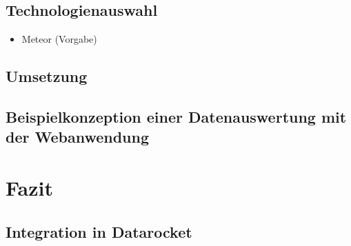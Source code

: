 \documentclass[
  language=german, %
  type=bachelor%
]{isthesis}
\begin{document}
\begin{content}
  \section{Technologienauswahl}
  \begin{itemize}
    \item Meteor (Vorgabe)
  \end{itemize}

  \section{Umsetzung}

  \section{Beispielkonzeption einer Datenauswertung mit der Webanwendung}


\chapter{Fazit}
 \section{Integration in Datarocket}

  

  

\end{content}



%  







\end{document}
